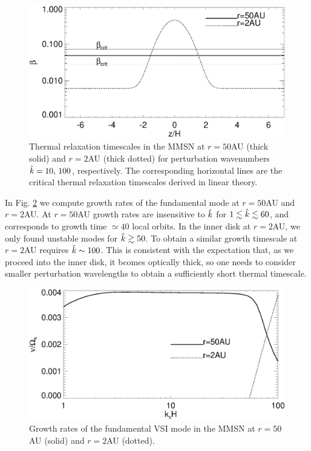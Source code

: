 \begin{figure}
  \includegraphics[width=\linewidth,clip=true,trim=0cm 0cm 0cm
  0cm]{figures/beta_compare} 
  \caption{Thermal relaxation timescales in the MMSN at $r=50$AU
    (thick solid) and $r=2$AU (thick dotted) for perturbation
    wavenumbers $\hat{k}=10,\,100$, respectively. The corresponding
    horizontal lines are the critical thermal relaxation timescales
    derived in linear theory. 
    \label{beta_compare}}  
\end{figure}

In Fig. \ref{eigen_compare_mmsn} we compute growth rates of the
fundamental mode at $r=50$AU and $r=2$AU. At $r=50$AU growth rates are
insensitive to $\hat{k}$ for $1\lesssim \hat{k}\lesssim 60$, and
corresponds to growth time $\simeq 40$ local orbits. In the inner disk
at $r=2$AU, we only found unstable modes for $\hat{k}\gtrsim50$. To
obtain a similar growth timescale at $r=2$AU requires $\hat{k}\sim
100$. This is consistent with the expectation that, as we proceed into
the inner disk, it bcomes optically thick, so one needs to consider
smaller perturbation wavelengths to obtain a sufficiently short
thermal timescale.  


\begin{figure}
  \includegraphics[width=\linewidth,clip=true,trim=0cm 0cm 0cm
  0cm]{figures/eigen_compare_grow_mmsn} 
  \caption{Growth rates of the fundamental VSI mode in the MMSN at
    $r=50$AU (solid) and $r=2$AU (dotted). 
    \label{eigen_compare_mmsn}}  
\end{figure}

